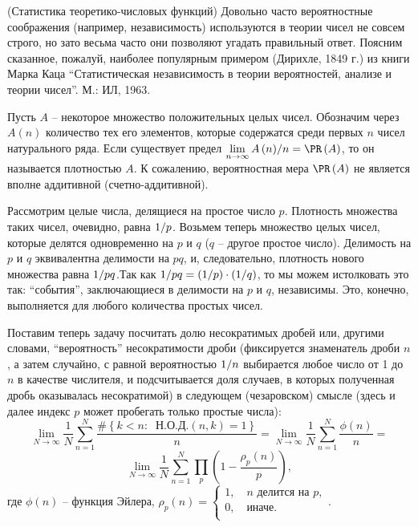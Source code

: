 \begin{problem}\Star(Статистика теоретико-числовых функций)
\label{sec:z_func_riman}
Довольно часто 
вероятностные соображения (например, независимость) используются в теории 
чисел не совсем строго, но зато весьма часто они позволяют угадать 
правильный ответ. Поясним сказанное, пожалуй, наиболее популярным примером (Дирихле, 1849 г.) 
из книги  Марка Каца 
``Статистическая независимость в теории вероятностей, анализе и теории 
чисел''. М.: ИЛ, 1963.

Пусть $A$ -- некоторое множество положительных целых чисел. Обозначим через 
$A\left( n \right)$ количество тех его элементов, которые содержатся среди 
первых $n$ чисел натурального ряда. Если существует предел $\mathop {\lim 
}\limits_{n\to \infty } {A\left( n \right)} \mathord{\left/ {\vphantom 
{{A\left( n \right)} n}} \right. \kern-\nulldelimiterspace} n=\PR\left( A 
\right)$, то он называется плотностью $A$. К сожалению, вероятностная мера 
$\PR\left( A \right)$ не является вполне аддитивной (счетно-аддитивной).

Рассмотрим целые числа, делящиеся на простое число $p$. Плотность множества 
таких чисел, очевидно, равна $1 \mathord{\left/ {\vphantom {1 p}} \right. 
\kern-\nulldelimiterspace} p$. Возьмем теперь множество целых чисел, которые 
делятся одновременно на $p$ и $q$ ($q$ -- другое простое число). Делимость 
на $p$ и $q$ эквивалентна делимости на $pq$, и, следовательно, плотность 
нового множества равна $1 \mathord{\left/ {\vphantom {1 {pq}}} \right. 
\kern-\nulldelimiterspace} {pq}$.Так как $1 \mathord{\left/ {\vphantom {1 
{pq}}} \right. \kern-\nulldelimiterspace} {pq}=\left( {1 \mathord{\left/ 
{\vphantom {1 p}} \right. \kern-\nulldelimiterspace} p} \right)\cdot \left( 
{1 \mathord{\left/ {\vphantom {1 q}} \right. \kern-\nulldelimiterspace} q} 
\right)$, то мы можем истолковать это так: ``события'', заключающиеся в 
делимости на $p$ и $q$, независимы. Это, конечно, выполняется для любого 
количества простых чисел.

Поставим теперь задачу посчитать долю несократимых дробей или, другими 
словами, ``вероятность'' несократимости дроби (фиксируется знаменатель дроби 
$n$, а затем случайно, с равной вероятностью $1 \mathord{\left/ {\vphantom 
{1 n}} \right. \kern-\nulldelimiterspace} n$ выбирается любое число от 1 до 
$n$ в качестве числителя, и подсчитывается доля случаев, в которых 
полученная дробь оказывалась несократимой) в следующем (чезаровском) смысле 
(здесь и далее индекс $p$ может пробегать только простые числа):
\[
\mathop {\lim }\limits_{N\to \infty } \frac{1}{N}\sum\limits_{n=1}^N 
{\frac{\# \left\{ {k<n:\;\;\text{Н.О.Д.}\left( {n,k} \right)=1} \right\}}{n}} 
=\mathop {\lim }\limits_{N\to \infty } \frac{1}{N}\sum\limits_{n=1}^N 
{\frac{\phi \left( n \right)}{n}} = \]\[\mathop {\lim }\limits_{N\to \infty } 
\frac{1}{N}\sum\limits_{n=1}^N {\prod\limits_p {\left( {1-\frac{\rho _p 
\left( n \right)}{p}} \right)} } ,
\]
где $\phi \left( n \right)$ -- функция Эйлера, $\rho _p \left( n 
\right)=\left\{ {\begin{array}{l}
 1,\quad n\mbox{ делится на }p, \\ 
 0,\quad \mbox{иначе}. \\ 
 \end{array}} \right.$.


\end{problem}
